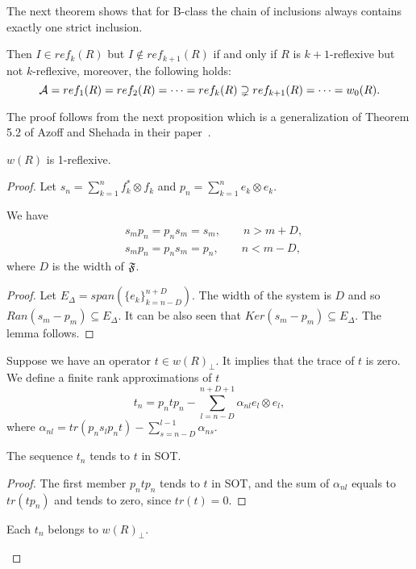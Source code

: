 \documentclass[12pt]{amsart}
\theoremstyle{case}
\begin{document}
  The next theorem shows that for B-class the chain of inclusions always contains
    exactly one strict inclusion.
  \begin{theorem}
    \label{thm:chain}
    Then $I \in ref_k(R)$ but $I \not\in ref_{k+1}(R)$ if and only if $R$ is $k + 1$-reflexive but not $k$-reflexive, moreover,
      the following holds:
    \[
      \cal{A} = ref_1(R) = ref_2(R) = \dots = ref_k(R) \supsetneq ref_{k + 1}(R) = \dots = w_0(R).
    \]
  \end{theorem}
  The proof follows from the next proposition which
   is a generalization of Theorem 5.2 of Azoff and Shehada in their paper~\cite{azoff}.
  \begin{prop}
    $w(R)$ is 1-reflexive.
  \end{prop}
  \begin{proof}
    Let $s_n = \sum_{k=1}^n f^*_k \otimes f_k$ and $p_n = \sum_{k=1}^n e_k \otimes e_k$.
    \begin{lemma}
      We have
      \begin{align*}
        &s_m p_n = p_n s_m = s_m, \qquad n > m + D,\\
        &s_m p_n = p_n s_m = p_n, \qquad n < m - D,
      \end{align*}
      where $D$ is the width of $\fsys$.
    \end{lemma}
    \begin{proof}
      Let $E_\Delta = span(\{e_k\}_{k=n-D}^{n+D})$.
      The width of the system is $D$ and so $Ran(s_m - p_m) \subseteq E_\Delta$.
      It can be also seen that $Ker(s_m - p_m) \subseteq E_\Delta$.
      The lemma follows.
    \end{proof}
    Suppose we have an operator $t \in w(R)_\perp$.
    It implies that the trace of $t$ is zero.
    We define a finite rank approximations of $t$
    \[
      t_n = p_n t p_n - \sum_{l = n - D}^{n + D + 1} \alpha_{nl} e_l \otimes e_l,
    \]
    where $\alpha_{nl} = tr(p_n s_l p_n t) - \displaystyle\sum_{s = n-D}^{l - 1} \alpha_{n s}$.
    \begin{lemma}
      The sequence $t_n$ tends to $t$ in SOT.
    \end{lemma}
    \begin{proof}
      The first member $p_n t p_n$ tends to $t$ in SOT, and the sum of $\alpha_{nl}$ equals to 
        $tr(t p_n)$ and tends to zero, since $tr(t) = 0$.
    \end{proof}
    \begin{lemma}
      Each $t_n$ belongs to $w(R)_\perp$.
    \end{lemma}

\end{proof}
\end{document}
